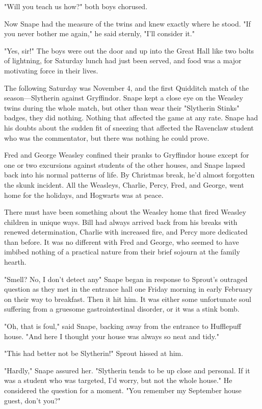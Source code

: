 "Will you teach us how?" both boys chorused.

Now Snape had the measure of the twins and knew exactly where he stood. "If you never bother me again," he said sternly, "I'll consider it."

"Yes, sir!" The boys were out the door and up into the Great Hall like two bolts of lightning, for Saturday lunch had just been served, and food was a major motivating force in their lives.

The following Saturday was November 4, and the first Quidditch match of the season—Slytherin against Gryffindor. Snape kept a close eye on the Weasley twins during the whole match, but other than wear their "Slytherin Stinks" badges, they did nothing. Nothing that affected the game at any rate. Snape had his doubts about the sudden fit of sneezing that affected the Ravenclaw student who was the commentator, but there was nothing he could prove.

Fred and George Weasley confined their pranks to Gryffindor house except for one or two excursions against students of the other houses, and Snape lapsed back into his normal patterns of life. By Christmas break, he'd almost forgotten the skunk incident. All the Weasleys, Charlie, Percy, Fred, and George, went home for the holidays, and Hogwarts was at peace.

There must have been something about the Weasley home that fired Weasley children in unique ways. Bill had always arrived back from his breaks with renewed determination, Charlie with increased fire, and Percy more dedicated than before. It was no different with Fred and George, who seemed to have imbibed nothing of a practical nature from their brief sojourn at the family hearth.

"Smell? No, I don't detect any{\el}" Snape began in response to Sprout's outraged question as they met in the entrance hall one Friday morning in early February on their way to breakfast. Then it hit him. It was either some unfortunate soul suffering from a gruesome gastrointestinal disorder, or it was a stink bomb.

"Oh, that is foul," said Snape, backing away from the entrance to Hufflepuff house. "And here I thought your house was always so neat and tidy."

"This had better not be Slytherin!" Sprout hissed at him.

"Hardly," Snape assured her. "Slytherin tends to be up close and personal. If it was a student who was targeted, I'd worry, but not the whole house." He considered the question for a moment. "You remember my September house guest, don't you?"

